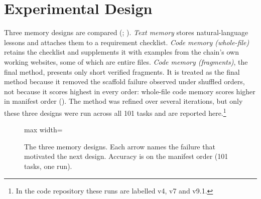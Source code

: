 \section{Experimental Design}
\label{sec:design}
Three memory designs are compared (; ). \emph{Text memory} stores natural-language lessons and attaches them to a requirement checklist. \emph{Code memory (whole-file)} retains the checklist and supplements it with examples from the chain's own working websites, some of which are entire files. \emph{Code memory (fragments)}, the final method, presents only short verified fragments. It is treated as the final method because it removed the scaffold failure observed under shuffled orders, not because it scores highest in every order: whole-file code memory scores higher in manifest order (). The method was refined over several iterations, but only these three designs were run across all 101 tasks and are reported here.\footnote{In the code repository these runs are labelled v4, v7 and v9.1.}

\begin{figure}[ht]
\centering
\begin{adjustbox}{max width=\textwidth}
\end{adjustbox}
\caption{The three memory designs. Each arrow names the failure that motivated the next design. Accuracy is on the manifest order (101 tasks, one run).}
\label{fig:families}
\end{figure}

